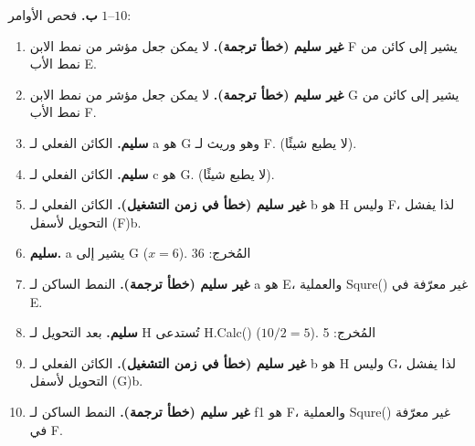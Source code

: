 \begin{boxSolution}
\textbf{ب.} فحص الأوامر $1$–$10$:
\begin{enumerate}[label=\textbf{\arabic*.}, itemsep=0.25em]
    \item \textbf{غير سليم (خطأ ترجمة).} لا يمكن جعل مؤشر من نمط الابن \textenglish{F} يشير إلى كائن من نمط الأب \textenglish{E}.
    \item \textbf{غير سليم (خطأ ترجمة).} لا يمكن جعل مؤشر من نمط الابن \textenglish{G} يشير إلى كائن من نمط الأب \textenglish{F}.
    \item \textbf{سليم.} الكائن الفعلي لـ \textenglish{a} هو \textenglish{G} وهو وريث لـ \textenglish{F}. (لا يطبع شيئًا).
    \item \textbf{سليم.} الكائن الفعلي لـ \textenglish{c} هو \textenglish{G}. (لا يطبع شيئًا).
    \item \textbf{غير سليم (خطأ في زمن التشغيل).} الكائن الفعلي لـ \textenglish{b} هو \textenglish{H} وليس \textenglish{F}، لذا يفشل التحويل لأسفل \textenglish{(F)b}.
    \item \textbf{سليم.} \textenglish{a} يشير إلى \textenglish{G} ($x = 6$). المُخرج: \textenglish{36}
    \item \textbf{غير سليم (خطأ ترجمة).} النمط الساكن لـ \textenglish{a} هو \textenglish{E}، والعملية \textenglish{Squre()} غير معرّفة في \textenglish{E}.
    \item \textbf{سليم.} بعد التحويل لـ \textenglish{H} تُستدعى \textenglish{H.Calc()} ($10 / 2 = 5$). المُخرج: \textenglish{5}
    \item \textbf{غير سليم (خطأ في زمن التشغيل).} الكائن الفعلي لـ \textenglish{b} هو \textenglish{H} وليس \textenglish{G}، لذا يفشل التحويل لأسفل \textenglish{(G)b}.
    \item \textbf{غير سليم (خطأ ترجمة).} النمط الساكن لـ \textenglish{f1} هو \textenglish{F}، والعملية \textenglish{Squre()} غير معرّفة في \textenglish{F}.
\end{enumerate}
\end{boxSolution}
\fi
\filbreak
